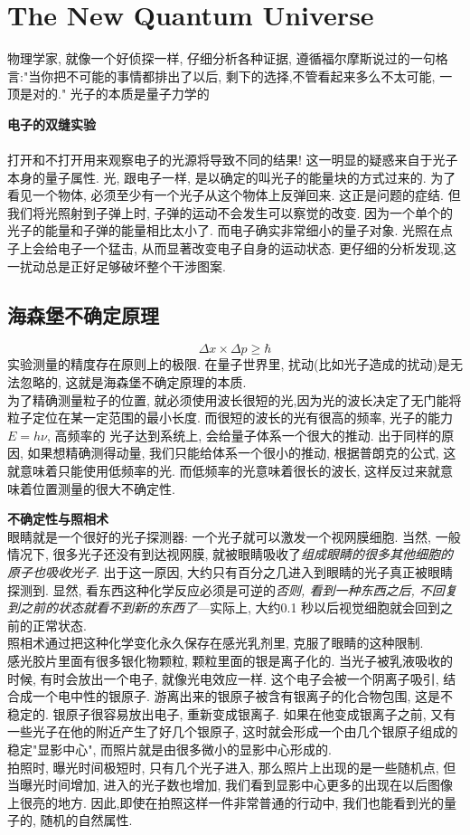 \documentclass[openany]{book}
\begin{document}
\chapter{The New Quantum Universe}
物理学家, 就像一个好侦探一样, 仔细分析各种证据, 遵循福尔摩斯说过的一句格言:"当你把不可能的事情都排出了以后, 剩下的选择,不管看起来多么不太可能, 一顶是对的."  \newline
光子的本质是量子力学的

\textbf{电子的双缝实验}\\
\\
打开和不打开用来观察电子的光源将导致不同的结果! 这一明显的疑惑来自于光子本身的量子属性. 光, 跟电子一样, 是以确定的叫光子的能量块的方式过来的. 为了看见一个物体, 必须至少有一个光子从这个物体上反弹回来. 这正是问题的症结. 但我们将光照射到子弹上时, 子弹的运动不会发生可以察觉的改变. 因为一个单个的光子的能量和子弹的能量相比太小了. 而电子确实非常细小的量子对象. 光照在点子上会给电子一个猛击, 从而显著改变电子自身的运动状态. 更仔细的分析发现,这一扰动总是正好足够破坏整个干涉图案.
\bigskip

\section{海森堡不确定原理}
$$
\Delta x\times \Delta p \geq \hbar
$$
实验测量的精度存在原则上的极限. 在量子世界里, 扰动(比如光子造成的扰动)是无法忽略的, 这就是海森堡不确定原理的本质.\\
为了精确测量粒子的位置, 就必须使用波长很短的光,因为光的波长决定了无门能将粒子定位在某一定范围的最小长度. 而很短的波长的光有很高的频率, 光子的能力$E=h\nu$, 高频率的
光子达到系统上, 会给量子体系一个很大的推动. 出于同样的原因, 如果想精确测得动量, 我们只能给体系一个很小的推动, 根据普朗克的公式, 这就意味着只能使用低频率的光. 而低频率的光意味着很长的波长, 这样反过来就意味着位置测量的很大不确定性.
\bigskip

\textbf{不确定性与照相术}\\
眼睛就是一个很好的光子探测器: 一个光子就可以激发一个视网膜细胞. 当然, 一般情况下, 很多光子还没有到达视网膜, 就被眼睛吸收了\textit{组成眼睛的很多其他细胞的原子也吸收光子}.
出于这一原因, 大约只有百分之几进入到眼睛的光子真正被眼睛探测到. 显然, 看东西这种化学反应必须是可逆的\textit{否则, 看到一种东西之后, 不回复到之前的状态就看不到新的东西了}---实际上, 大约0.1 秒以后视觉细胞就会回到之前的正常状态. \\
照相术通过把这种化学变化永久保存在感光乳剂里, 克服了眼睛的这种限制.\\
感光胶片里面有很多银化物颗粒, 颗粒里面的银是离子化的. 当光子被乳液吸收的时候, 有时会放出一个电子, 就像光电效应一样. 这个电子会被一个阴离子吸引, 结合成一个电中性的银原子.
游离出来的银原子被含有银离子的化合物包围, 这是不稳定的. 银原子很容易放出电子, 重新变成银离子. 如果在他变成银离子之前, 又有一些光子在他的附近产生了好几个银原子, 这时就会形成一个由几个银原子组成的稳定"显影中心", 而照片就是由很多微小的显影中心形成的.\\
拍照时, 曝光时间极短时, 只有几个光子进入, 那么照片上出现的是一些随机点, 但当曝光时间增加, 进入的光子数也增加, 我们看到显影中心更多的出现在以后图像上很亮的地方. 因此,即使在拍照这样一件非常普通的行动中, 我们也能看到光的量子的, 随机的自然属性.
\bigskip
\end{document}
